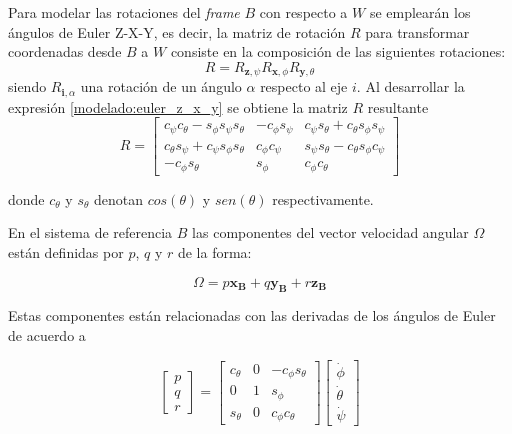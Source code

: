 Para modelar las rotaciones del \textit{frame} $B$ con respecto a $W$ se emplearán los ángulos de Euler Z-X-Y, es decir, la matriz de rotación $R$ para transformar coordenadas desde $B$ a $W$ consiste en la composición de las siguientes rotaciones:
\begin{equation}
	R = R_{\mathbf{z},\psi}R_{\mathbf{x},\phi}R_{\mathbf{y},\theta}
	\label{modelado:euler_z_x_y}
\end{equation}
siendo $R_{\mathbf{i},\alpha}$ una rotación de un ángulo $\alpha$ respecto al eje $i$. Al desarrollar la expresión \ref{modelado:euler_z_x_y} se obtiene la matriz $R$ resultante
\begin{equation}
	\label{modelado:R}
	R = \begin{bmatrix}
		c_{\psi} c_{\theta} - s_{\phi} s_{\psi} s_{\theta} &  -c_{\phi} s_{\psi}& c_{\psi} s_{\theta} +  c_{\theta} s_{\phi} s_{\psi}\\
		c_{\theta} s_{\psi} +  c_{\psi} s_{\phi} s_{\theta} & c_{\phi} c_{\psi} & s_{\psi} s_{\theta} -  c_{\theta} s_{\phi} c_{\psi} \\
		-c_{\phi}s_{\theta}& s_{\phi} & c_{\phi}c_{\theta} 
	\end{bmatrix}
\end{equation}

donde $c_{\theta}$ y $s_{\theta}$ denotan $cos(\theta)$ y $sen(\theta)$ respectivamente.

En el sistema de referencia $B$ las componentes del vector velocidad angular $\Omega$ están definidas por $p$, $q$ y $r$ de la forma: 

\begin{equation}
	\Omega = p \mathbf{x_B} + q \mathbf{y_B} + r \mathbf{z_B}
	\label{refOmega}
\end{equation}

Estas componentes están relacionadas con las derivadas de los ángulos de Euler de acuerdo a

\begin{equation}
	\begin{bmatrix}
		p\\
		q\\
		r
	\end{bmatrix}  = \begin{bmatrix}
	c_{\theta}&0& -c_{\phi} s_{\theta}\\
	0 & 1 & s_{\phi}\\
	s_{\theta}&0 & c_{\phi} c_{\theta}
\end{bmatrix}\begin{bmatrix}
\dot{\phi}\\
\dot{\theta}\\
\dot{\psi}
\end{bmatrix} 
\end{equation}

